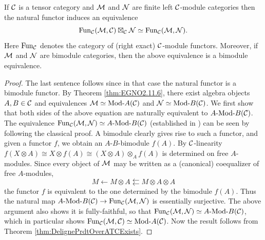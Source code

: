 \documentclass{amsart}
\begin{document}
\begin{lemma} \label{Lma:FunctorsAsATensorPdt}
	If $\mathcal C$ is a tensor category and $\mathcal M$ and $\mathcal N$ are finite left $\mathcal C$-module categories then the natural functor induces an equivalence
	\begin{equation*}
		\operatorname{Fun}_\mathcal C(\mathcal M, \mathcal C) \boxtimes_\mathcal C \mathcal N \simeq \operatorname{Fun}_\mathcal C(\mathcal M,\mathcal N).
	\end{equation*}
	Here $\operatorname{Fun}_\mathcal C$ denotes the category of (right exact) $\mathcal C$-module functors. 
	Moreover, if $\mathcal M$ and $\mathcal N$ are bimodule categories, then the above equivalence is a bimodule equivalence. 
\end{lemma}

\begin{proof}
	The last sentence follows since in that case the natural functor is a bimodule functor. By Theorem \ref{thm:EGNO2.11.6}, there exist algebra objects $A, B \in \mathcal C$ and equivalences $\cM \simeq \Mod{}{A}(\cC)$ and $\cN \simeq \Mod{}{B}(\cC)$. We first show that both sides of the above equation are naturally equivalent to $\Mod{A}{B}(\cC)$. The equivalence $\Fun_\cC(\cM, \cN) \simeq \Mod{A}{B}(\cC)$ (established in \cite[Prop 2.12.2]{EGNO}) can be seen by following the classical proof. A bimodule clearly gives rise to such a functor, and given a functor $f$, we obtain an $A$-$B$-bimodule $f(A)$. By $\mathcal C$-linearity $f(X \otimes A) \cong X \otimes f(A)  \cong (X \otimes A) \otimes_A f(A) $ is determined on free $A$-modules. Since every object of $\mathcal M$ may be written as a (canonical) coequalizer of free $A$-modules,
	\begin{equation*}
		M \leftarrow M \otimes A \leftleftarrows M \otimes A \otimes A
	\end{equation*} 
the functor $f$ is equivalent to the one determined by the bimodule $f(A)$. Thus the natural map  $\Mod{A}{B}(\cC) \to \Fun_\cC(\cM, \cN)$ is essentially surjective. The above argument also shows it is fully-faithful, so that $\Fun_\cC(\cM, \cN) \simeq \Mod{A}{B}(\cC)$, which in particular shows $\Fun_\cC(\cM, \cC) \simeq \Mod{}{A}(\cC)$. Now the result follows from Theorem \ref{thm:DelignePrdtOverATCExists}.

\end{proof}
\end{document}
